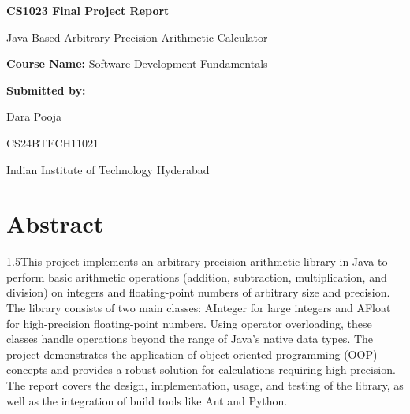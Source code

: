\documentclass{article}
\begin{document}
\begin{titlepage}
    \centering
    \vspace*{4cm}
    
    {\Huge \bfseries CS1023 Final Project Report \par}
    \vspace{0.2cm}
    {\Huge  Java-Based Arbitrary Precision Arithmetic Calculator \par}
    \vspace{2cm}
    
    {\fontsize{16pt}{30pt}\selectfont \textbf{Course Name:} Software Development Fundamentals \par}
    \vspace{1cm}
    {\fontsize{16pt}{30pt}\selectfont \textbf{Submitted by:}\par}
    {\fontsize{16pt}{30pt}\selectfont Dara Pooja\par}
    {\fontsize{14pt}{30pt}\selectfont CS24BTECH11021\par}
    \vspace{4cm}
    {\fontsize{14pt}{30pt}\selectfont Indian Institute of Technology Hyderabad\par}
    \vfill
    \thispagestyle{empty} %
\end{titlepage}

\pagestyle{mainpages}

\section{\fontsize{16pt}{30pt}Abstract}

 \begin{spacing}{1.5}{\large This project implements an arbitrary precision arithmetic library in Java to perform basic arithmetic operations (addition, subtraction, multiplication, and division) on integers and floating-point numbers of arbitrary size and precision. The library consists of two main classes: AInteger for large integers and AFloat for high-precision floating-point numbers. Using operator overloading, these classes handle operations beyond the range of Java’s native data types. The project demonstrates the application of object-oriented programming (OOP) concepts and provides a robust solution for calculations requiring high precision. The report covers the design, implementation, usage, and testing of the library, as well as the integration of build tools like Ant and Python.}
 \end{spacing}
\end{document}
